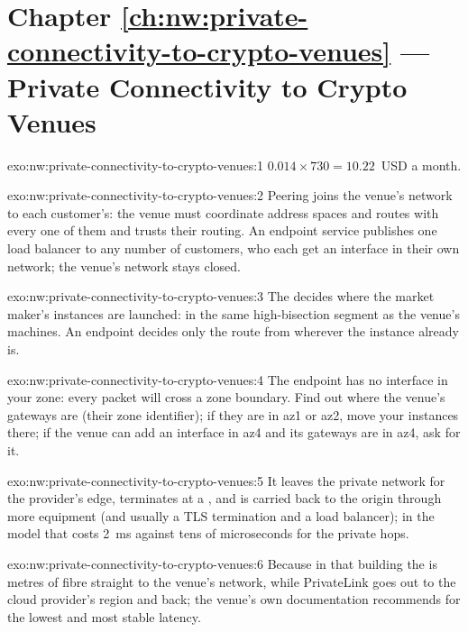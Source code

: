 \section*{Chapter \ref{ch:nw:private-connectivity-to-crypto-venues} --- Private Connectivity to Crypto Venues}

\begin{solution}{exo:nw:private-connectivity-to-crypto-venues:1}
$0.014 \times 730 = 10.22$~USD a month.
\end{solution}

\begin{solution}{exo:nw:private-connectivity-to-crypto-venues:2}
Peering joins the venue's network to each customer's: the venue must coordinate address spaces and routes with every one of them and trusts their
routing. An endpoint service publishes one load balancer to any number of customers, who each get an interface in their own network; the venue's
network stays closed.
\end{solution}

\begin{solution}{exo:nw:private-connectivity-to-crypto-venues:3}
The  decides where the market maker's instances are launched: in the same high-bisection segment as the venue's machines. An endpoint
decides only the route from wherever the instance already is.
\end{solution}

\begin{solution}{exo:nw:private-connectivity-to-crypto-venues:4}
The endpoint has no interface in your zone: every packet will cross a zone boundary. Find out where the venue's gateways are (their zone
identifier); if they are in az1 or az2, move your instances there; if the venue can add an interface in az4 and its gateways are in az4, ask for it.
\end{solution}

\begin{solution}{exo:nw:private-connectivity-to-crypto-venues:5}
It leaves the private network for the provider's edge, terminates at a , and is carried back to the origin through more equipment
(and usually a TLS termination and a load balancer); in the model that costs \qty{2}{\milli\second} against tens of microseconds for the private
hops.
\end{solution}

\begin{solution}{exo:nw:private-connectivity-to-crypto-venues:6}
Because in that building the  is metres of fibre straight to the venue's network, while PrivateLink goes out to the cloud provider's
region and back; the venue's own documentation recommends  for the lowest and most stable latency.
\end{solution}

